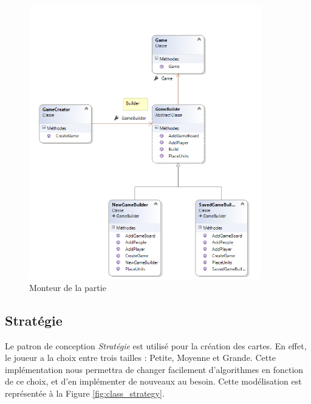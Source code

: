 \documentclass[a4paper]{article}
\begin{document}
\begin{figure}[ht]
\centering
	\includegraphics[width=0.9\textwidth, height=0.7\textheight]{../Schemas/class_GameBoardBuilder_Builder.png}
		\caption{Monteur de la partie}
		\label{fig:class_builder}
\end{figure}

\clearpage
	\subsection{Stratégie}
Le patron de conception \textit{Stratégie} est utilisé pour la création des cartes. En effet, le joueur a la choix entre trois tailles : Petite, Moyenne et Grande. Cette implémentation nous permettra de changer facilement d'algorithmes en fonction de ce choix, et d'en implémenter de nouveaux au besoin. Cette modélisation est représentée à la Figure \ref{fig:class_strategy}.
\end{document}
